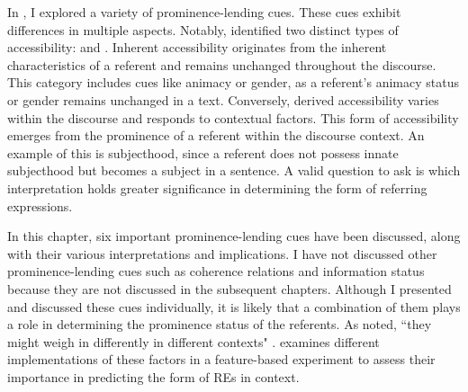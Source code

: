 In , I explored a variety of prominence-lending cues. These cues exhibit differences in multiple aspects. Notably, \citet{PratSala2000} identified two distinct types of accessibility:  and . Inherent accessibility originates from the inherent characteristics of a referent and remains unchanged throughout the discourse. This category includes cues like animacy or gender, as a referent's animacy status or gender remains unchanged in a text. Conversely, derived accessibility varies within the discourse and responds to contextual factors. This form of accessibility emerges from the prominence of a referent within the discourse context. An example of this is subjecthood, since a referent does not possess innate subjecthood but becomes a subject in a sentence. A valid question to ask is which interpretation holds greater significance in determining the form of referring expressions.

In this chapter, six important prominence-lending cues have been discussed, along with their various interpretations and implications. I have not discussed other prominence-lending cues such as coherence relations \citep{Hobbs1979,kehler2002coherence} and information status \citep{Lambrecht1994} because they are not discussed in the subsequent chapters. Although I presented and discussed these cues individually, it is likely that a combination of them plays a role in determining the prominence status of the referents. As noted, ``they might weigh in differently in different contexts" \citep[24]{de2015putting}.  examines different implementations of these factors in a feature-based \context experiment to assess their importance in predicting the form of REs in context.

